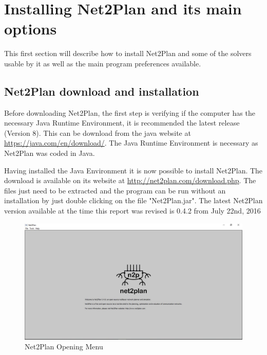 \graphicspath{{./figures/}}
\section{Installing Net2Plan and its main options}
This first section will describe how to install Net2Plan and some of the solvers usable by it as well as the main program preferences available.


    \subsection{Net2Plan download and installation}
    \vspace{0.5cm}
	Before downloading Net2Plan, the first step is verifying if the computer has the necessary Java Runtime Environment, it is recommended the latest release (Version 8). This can be download from the java website at \url{https://java.com/en/download/}. The Java Runtime Environment is necessary as Net2Plan was coded in Java.
		
    Having installed the Java Environment it is now possible to install Net2Plan. The download is available on its website at \url{http://net2plan.com/download.php}. The files just need to be extracted and the program can be run without an installation by just double clicking on the file "Net2Plan.jar". The latest Net2Plan version available at the time this report was revised is 0.4.2 from July 22nd, 2016

    \begin{figure}[h!]
       	\centering
       	\includegraphics[width = 13cm]{Net2Plan.pdf}
       	\caption{Net2Plan Opening Menu}
    \end{figure}

